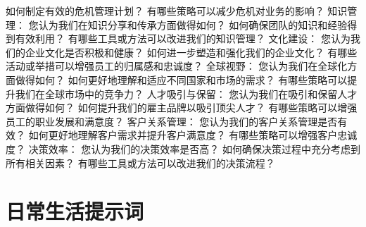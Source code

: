 \documentclass[12pt]{book}
\begin{document}
如何制定有效的危机管理计划？
有哪些策略可以减少危机对业务的影响？
知识管理：
您认为我们在知识分享和传承方面做得如何？
如何确保团队的知识和经验得到有效利用？
有哪些工具或方法可以改进我们的知识管理？
文化建设：
您认为我们的企业文化是否积极和健康？
如何进一步塑造和强化我们的企业文化？
有哪些活动或举措可以增强员工的归属感和忠诚度？
全球视野：
您认为我们在全球化方面做得如何？
如何更好地理解和适应不同国家和市场的需求？
有哪些策略可以提升我们在全球市场中的竞争力？
人才吸引与保留：
您认为我们在吸引和保留人才方面做得如何？
如何提升我们的雇主品牌以吸引顶尖人才？
有哪些策略可以增强员工的职业发展和满意度？
客户关系管理：
您认为我们的客户关系管理是否有效？
如何更好地理解客户需求并提升客户满意度？
有哪些策略可以增强客户忠诚度？
决策效率：
您认为我们的决策效率是否高？
如何确保决策过程中充分考虑到所有相关因素？
有哪些工具或方法可以改进我们的决策流程？

\chapter{日常生活提示词}
\end{document}
